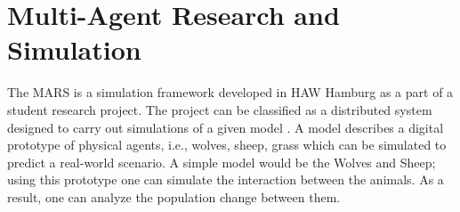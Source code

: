 
\section{Multi-Agent Research and Simulation}
        \label{section:MARS}
        The MARS is a simulation framework developed 
        in HAW Hamburg as a part of a student research project. The project can be classified as a
        distributed system \cite{DistributedSystems} designed to carry out simulations of a given model 
        \cite{HAWHamburgMARS}. 
        A model describes a digital prototype of physical agents, i.e., wolves, sheep, grass 
        which can be simulated to predict a real-world scenario. A simple model would
        be the Wolves and Sheep; using this prototype one can simulate the interaction between the animals. 
        As a result, one can analyze the population change between them.

        \par
